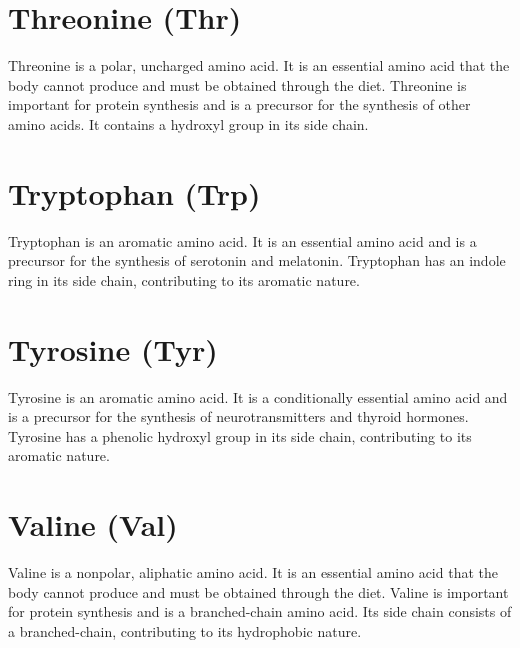 \documentclass{article}
\begin{document}
\section*{Threonine (Thr)}
Threonine is a polar, uncharged amino acid. It is an essential amino acid that the body cannot produce and must be obtained through the diet. Threonine is important for protein synthesis and is a precursor for the synthesis of other amino acids. It contains a hydroxyl group in its side chain.
\begin{center}
\end{center}

\section*{Tryptophan (Trp)}
Tryptophan is an aromatic amino acid. It is an essential amino acid and is a precursor for the synthesis of serotonin and melatonin. Tryptophan has an indole ring in its side chain, contributing to its aromatic nature.
\begin{center}
\end{center}

\section*{Tyrosine (Tyr)}
Tyrosine is an aromatic amino acid. It is a conditionally essential amino acid and is a precursor for the synthesis of neurotransmitters and thyroid hormones. Tyrosine has a phenolic hydroxyl group in its side chain, contributing to its aromatic nature.
\begin{center}
\end{center}

\section*{Valine (Val)}
Valine is a nonpolar, aliphatic amino acid. It is an essential amino acid that the body cannot produce and must be obtained through the diet. Valine is important for protein synthesis and is a branched-chain amino acid. Its side chain consists of a branched-chain, contributing to its hydrophobic nature.
\begin{center}
\end{center}
\newpage
\end{document}
